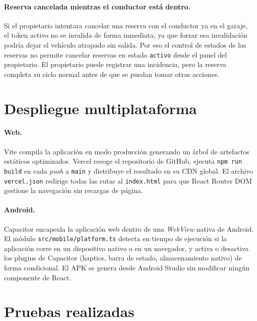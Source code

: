 \paragraph{Reserva cancelada mientras el conductor está dentro.} Si el propietario intentara cancelar una reserva con el conductor ya en el garaje, el token activo no se invalida de forma inmediata, ya que forzar esa invalidación podría dejar el vehículo atrapado sin salida. Por eso el control de estados de las reservas no permite cancelar reservas en estado \texttt{activo} desde el panel del propietario. El propietario puede registrar una incidencia, pero la reserva completa su ciclo normal antes de que se puedan tomar otras acciones.

\section{Despliegue multiplataforma}
\label{sec:impl_despliegue}

\paragraph{Web.}
Vite compila la aplicación en modo producción generando un árbol de artefactos estáticos optimizados. Vercel recoge el repositorio de GitHub, ejecuta \texttt{npm run build} en cada \textit{push} a \texttt{main} y distribuye el resultado en su CDN global. El archivo \texttt{vercel.json} redirige todas las rutas al \texttt{index.html} para que React Router DOM gestione la navegación sin recargas de página.

\paragraph{Android.}
Capacitor encapsula la aplicación web dentro de una \textit{WebView} nativa de Android. El módulo \texttt{src/mobile/platform.ts} detecta en tiempo de ejecución si la aplicación corre en un dispositivo nativo o en un navegador, y activa o desactiva los plugins de Capacitor (haptics, barra de estado, almacenamiento nativo) de forma condicional. El APK se genera desde Android Studio sin modificar ningún componente de React.

\section{Pruebas realizadas}
\label{sec:pruebas}

